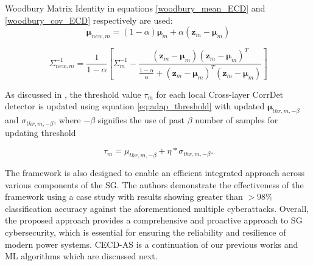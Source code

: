 \documentclass[conference]{IEEEtran}
\begin{document}
Woodbury Matrix Identity \cite{alveyzarecook2016} in equations \eqref{woodbury_mean_ECD} and \eqref{woodbury_cov_ECD} respectively are used: 
\begin{equation} \label{woodbury_mean_ECD} \mathbf{\mu}_{new,m} = (1-\alpha)\mathbf{\mu}_m + \alpha(\mathbf{z}_m-\mathbf{\mu}_m) \end{equation}

\begin{equation} \label{woodbury_cov_ECD} \Sigma^{-1}_{new, m} = \frac{1}{1-\alpha} \left[\Sigma^{-1}_m-\frac{(\mathbf{z}_m-\mathbf{\mu}_m)(\mathbf{z}_m-\mathbf{\mu}_m)^T}{\frac{1-\alpha}{\alpha}+(\mathbf{z}_m-\mathbf{\mu}_m)^T(\mathbf{z}_m-\mathbf{\mu}_m)}\right] \end{equation}

 As discussed in \cite{starke2022cross}, the threshold value $\tau_{m}$ for each local Cross-layer CorrDet detector is updated using equation \eqref{eq:adap_threshold} with updated $\mathbf{\mu}_{thr,m, -\beta}$ and $\sigma_{thr,m, -\beta}$, where $-\beta$ signifies the use of past $\beta$ number of samples for updating threshold

\begin{equation} \label{eq:adap_threshold} 
\tau_{m} = \mu_{thr,m, -\beta} + \eta * \sigma_{thr,m, -\beta}.
\end{equation}


The framework is also designed to enable an efficient integrated approach across various components of the SG. The authors demonstrate the effectiveness of the framework using a case study with results showing greater than $>98\%$ classification accuracy against the aforementioned multiple cyberattacks. Overall, the proposed approach provides a comprehensive and proactive approach to SG cybersecurity, which is essential for ensuring the reliability and resilience of modern power systems. CECD-AS is a continuation of our previous works and ML algorithms \cite{nagaraj2020ensemble,trevizan2019data,ruben2020hybrid} which are discussed next. 
\end{document}

